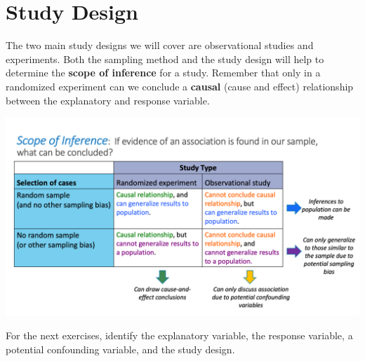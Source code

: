 \documentclass[
]{report}
\begin{document}
\newpage

\hypertarget{study-design-1}{%
\section{Study Design}\label{study-design-1}}

The two main study designs we will cover are observational studies and experiments. Both the sampling method and the study design will help to determine the \textbf{scope of inference} for a study. Remember that only in a randomized experiment can we conclude a \textbf{causal} (cause and effect) relationship between the explanatory and response variable.

\begin{center}\includegraphics[width=0.75\linewidth]{images/ScopeOfInference} \end{center}

For the next exercises, identify the explanatory variable, the response variable, a potential confounding variable, and the study design.
\end{document}
